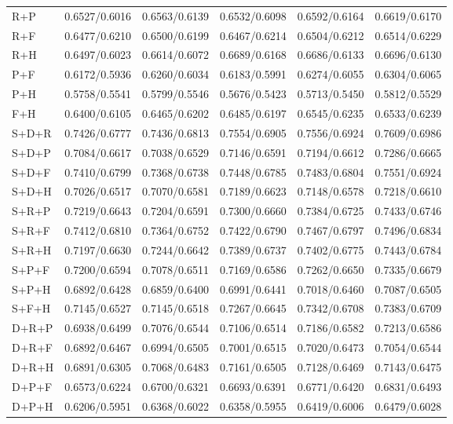 \begin{longtable}{lrrrrr}
R+P & 0.6527/0.6016 & 0.6563/0.6139 & 0.6532/0.6098 & 0.6592/0.6164 & 0.6619/0.6170 \\
R+F & 0.6477/0.6210 & 0.6500/0.6199 & 0.6467/0.6214 & 0.6504/0.6212 & 0.6514/0.6229 \\
R+H & 0.6497/0.6023 & 0.6614/0.6072 & 0.6689/0.6168 & 0.6686/0.6133 & 0.6696/0.6130 \\
P+F & 0.6172/0.5936 & 0.6260/0.6034 & 0.6183/0.5991 & 0.6274/0.6055 & 0.6304/0.6065 \\
P+H & 0.5758/0.5541 & 0.5799/0.5546 & 0.5676/0.5423 & 0.5713/0.5450 & 0.5812/0.5529 \\
F+H & 0.6400/0.6105 & 0.6465/0.6202 & 0.6485/0.6197 & 0.6545/0.6235 & 0.6533/0.6239 \\
S+D+R & 0.7426/0.6777 & 0.7436/0.6813 & 0.7554/0.6905 & 0.7556/0.6924 & 0.7609/0.6986 \\
S+D+P & 0.7084/0.6617 & 0.7038/0.6529 & 0.7146/0.6591 & 0.7194/0.6612 & 0.7286/0.6665 \\
S+D+F & 0.7410/0.6799 & 0.7368/0.6738 & 0.7448/0.6785 & 0.7483/0.6804 & 0.7551/0.6924 \\
S+D+H & 0.7026/0.6517 & 0.7070/0.6581 & 0.7189/0.6623 & 0.7148/0.6578 & 0.7218/0.6610 \\
S+R+P & 0.7219/0.6643 & 0.7204/0.6591 & 0.7300/0.6660 & 0.7384/0.6725 & 0.7433/0.6746 \\
S+R+F & 0.7412/0.6810 & 0.7364/0.6752 & 0.7422/0.6790 & 0.7467/0.6797 & 0.7496/0.6834 \\
S+R+H & 0.7197/0.6630 & 0.7244/0.6642 & 0.7389/0.6737 & 0.7402/0.6775 & 0.7443/0.6784 \\
S+P+F & 0.7200/0.6594 & 0.7078/0.6511 & 0.7169/0.6586 & 0.7262/0.6650 & 0.7335/0.6679 \\
S+P+H & 0.6892/0.6428 & 0.6859/0.6400 & 0.6991/0.6441 & 0.7018/0.6460 & 0.7087/0.6505 \\
S+F+H & 0.7145/0.6527 & 0.7145/0.6518 & 0.7267/0.6645 & 0.7342/0.6708 & 0.7383/0.6709 \\
D+R+P & 0.6938/0.6499 & 0.7076/0.6544 & 0.7106/0.6514 & 0.7186/0.6582 & 0.7213/0.6586 \\
D+R+F & 0.6892/0.6467 & 0.6994/0.6505 & 0.7001/0.6515 & 0.7020/0.6473 & 0.7054/0.6544 \\
D+R+H & 0.6891/0.6305 & 0.7068/0.6483 & 0.7161/0.6505 & 0.7128/0.6469 & 0.7143/0.6475 \\
D+P+F & 0.6573/0.6224 & 0.6700/0.6321 & 0.6693/0.6391 & 0.6771/0.6420 & 0.6831/0.6493 \\
D+P+H & 0.6206/0.5951 & 0.6368/0.6022 & 0.6358/0.5955 & 0.6419/0.6006 & 0.6479/0.6028 \\

\end{longtable}
